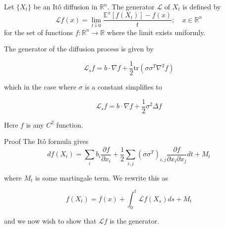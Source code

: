 \documentclass{beamer}
\begin{document}
\begin{frame}
\begin{definition}[Generator]
	Let $\{X_t\}$ be an Itô diffusion in $\mathbb{R}^n$. The generator $\mathcal{L}$ of $X_t$ is defined by
	\begin{equation*}
		\mathcal{L}f(x) = \lim_{t \downarrow 0}\frac{\mathbb{E}^x[f(X_t)] - f(x)}{t}; \quad x \in \mathbb{R}^n
	\end{equation*}
	for the set of functions $f:\mathbb{R}^n \to \mathbb{R}$ where the limit exists uniformly.
\end{definition}
\end{frame}

\begin{frame}
	\begin{theorem}
	\label{thm:diffgen}
The generator of the diffusion process is given by

\begin{equation*}
	\mathcal{L}_s f = b \cdot \nabla f + \frac{1}{2} \mathrm{tr}(\sigma\sigma^T \nabla^2 f)	
\end{equation*}

which in the case where $\sigma$ is a constant simplifies to 

\begin{equation*}
	\mathcal{L}_s f = b \cdot \nabla f + \frac{1}{2} \sigma^2 \Delta f	
\end{equation*}

Here $f$ is any $C^2$ function.
\end{theorem}
\end{frame}

\begin{frame}
	\begin{block}{Proof}
	The Itô formula gives
	\begin{equation*}
		df(X_t) = \sum_i b_i \frac{\partial f}{\partial x_i} + \frac{1}{2}\sum_{i,j}(\sigma \sigma^{T})_{i,j} \frac{\partial f}{\partial x_i \partial x_j}dt + M_t
	\end{equation*}

	where $M_t$ is some martingale term. We rewrite this as 

	\begin{equation*}
		f(X_t) = f(x) + \int_0^t \mathcal{L}f(X_s)ds + M_t
	\end{equation*}

	and we now wish to show that $\mathcal{L}f$ is the generator.
	\end{block}
\end{frame}
\end{document}
